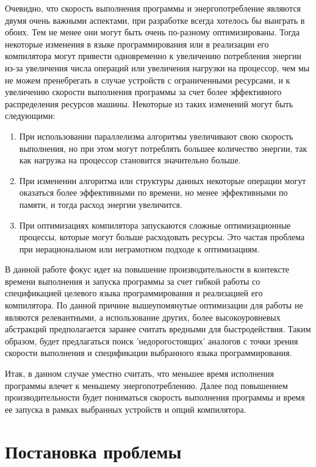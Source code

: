 \documentclass{mipt-thesis-bs}
\begin{document}
Очевидно, что скорость выполнения программы и энергопотребление являются двумя очень важными
аспектами, при разработке всегда хотелось бы выиграть в обоих. Тем не менее они могут
быть очень по-разному оптимизированы. Тогда некоторые изменения в языке программирования или
в реализации его компилятора могут привести одновременно к увеличению потребления энергии из-за
увеличения числа операций или увеличения нагрузки на процессор, чем мы
не можем пренебрегать в случае устройств с ограниченными ресурсами, и к увеличению скорости выполнения
программы за счет более эффективного распределения ресурсов машины. Некоторые из таких
изменений могут быть следующими:

\begin{enumerate}
    \item При использовании параллелизма алгоритмы увеличивают свою скорость выполнения, но при этом
    могут потреблять большее количество энергии, так как нагрузка на процессор становится
    значительно больше.
    \item При изменении алгоритма или структуры данных некоторые операции могут оказаться
    более эффективными по времени, но менее эффективными по памяти, и тогда расход
    энергии увеличится.
    \item При оптимизациях компилятора запускаются сложные оптимизационные процессы, которые
    могут больше расходовать ресурсы. Это частая проблема при нерациональном или
    неграмотном подходе к оптимизациям.
\end{enumerate}

В данной работе фокус идет на повышение производительности в контексте времени выполнения и
запуска программы за счет гибкой работы со спецификацией целевого языка программирования и
реализацией его компилятора. По данной причине вышеупомянутые оптимизации для работы не являются
релевантными, а использование других, более высокоуровневых абстракций предполагается заранее считать
вредными для быстродействия. Таким образом, будет предлагаться поиск 'недорогостоящих' аналогов
с точки зрения скорости выполнения и спецификации выбранного языка программирования.

Итак, в данном случае уместно считать, что меньшее время исполнения программы
влечет к меньшему энергопотреблению. Далее под повышением производительности будет пониматься скорость выполнения
программы и время ее запуска в рамках выбранных устройств и опций компилятора.



\chapter{Постановка проблемы}
\end{document}
